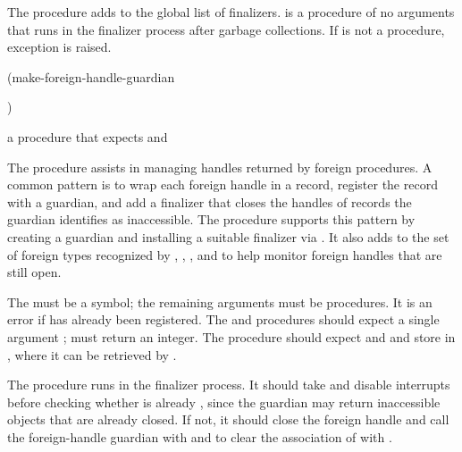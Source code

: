 The  procedure adds
 to the global list of finalizers.  is a
procedure of no arguments that runs in the finalizer process after
garbage collections. If  is not a procedure, exception
 is raised.

\begin{procedure}
\codebegin
(make-foreign-handle-guardian   \strut
                                )\strut
\codeend
\end{procedure}
\returns{} a procedure that expects  and 

The  procedure assists in managing handles
returned by foreign procedures.
A common pattern is to wrap each foreign handle in a record, register the
record with a guardian, and add a finalizer that closes the handles of records
the guardian identifies as inaccessible.
The  procedure supports this pattern
by creating a guardian and installing a suitable finalizer via .
It also adds  to the set of foreign types recognized by
,
,
, and
to help monitor foreign handles that are still open.

The  must be a symbol; the remaining arguments must be
procedures.  It is an error if  has already been registered.
The  and  procedures should expect a
single argument ;  must return an integer.
The  procedure should expect  and  and
store  in , where it can be retrieved by .

The  procedure runs in the finalizer process.
It should take  and disable interrupts before checking whether
 is already ,
since the guardian may return inaccessible objects that are already closed.
If not, it should close the foreign handle and call the foreign-handle guardian
with  and  to clear the association of  with .


